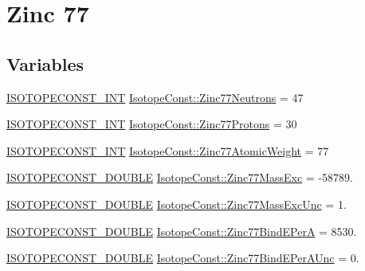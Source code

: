 \hypertarget{group___isotope_const-_zinc-_zn77}{}\section{Zinc 77}
\label{group___isotope_const-_zinc-_zn77}
\subsection*{Variables}
\begin{DoxyCompactItemize}
\item 
\mbox{\hyperlink{group___isotope_const-_macros_ga5f18360b3e99483a35c32d789e62621c}{I\+S\+O\+T\+O\+P\+E\+C\+O\+N\+S\+T\+\_\+\+I\+NT}} \mbox{\hyperlink{group___isotope_const-_zinc-_zn77_gaf83b475d95442bf20d1c2afee7363bde}{Isotope\+Const\+::\+Zinc77\+Neutrons}} = 47
\item 
\mbox{\hyperlink{group___isotope_const-_macros_ga5f18360b3e99483a35c32d789e62621c}{I\+S\+O\+T\+O\+P\+E\+C\+O\+N\+S\+T\+\_\+\+I\+NT}} \mbox{\hyperlink{group___isotope_const-_zinc-_zn77_gad1f29d86127bbfd0b9ba11cf315a9091}{Isotope\+Const\+::\+Zinc77\+Protons}} = 30
\item 
\mbox{\hyperlink{group___isotope_const-_macros_ga5f18360b3e99483a35c32d789e62621c}{I\+S\+O\+T\+O\+P\+E\+C\+O\+N\+S\+T\+\_\+\+I\+NT}} \mbox{\hyperlink{group___isotope_const-_zinc-_zn77_ga0e0edac8ec4bfad965b42fb162c54b7f}{Isotope\+Const\+::\+Zinc77\+Atomic\+Weight}} = 77
\item 
\mbox{\hyperlink{group___isotope_const-_macros_ga8f45a7272ce02c0b4c65c44636ed719a}{I\+S\+O\+T\+O\+P\+E\+C\+O\+N\+S\+T\+\_\+\+D\+O\+U\+B\+LE}} \mbox{\hyperlink{group___isotope_const-_zinc-_zn77_ga7d6e40d8e149b7a7a3e6421b8f39d718}{Isotope\+Const\+::\+Zinc77\+Mass\+Exc}} = -\/58789.
\item 
\mbox{\hyperlink{group___isotope_const-_macros_ga8f45a7272ce02c0b4c65c44636ed719a}{I\+S\+O\+T\+O\+P\+E\+C\+O\+N\+S\+T\+\_\+\+D\+O\+U\+B\+LE}} \mbox{\hyperlink{group___isotope_const-_zinc-_zn77_ga12800d3294bad76a0795364d4e72868f}{Isotope\+Const\+::\+Zinc77\+Mass\+Exc\+Unc}} = 1.
\item 
\mbox{\hyperlink{group___isotope_const-_macros_ga8f45a7272ce02c0b4c65c44636ed719a}{I\+S\+O\+T\+O\+P\+E\+C\+O\+N\+S\+T\+\_\+\+D\+O\+U\+B\+LE}} \mbox{\hyperlink{group___isotope_const-_zinc-_zn77_ga7f7660dde0393b3ac4640e4b68af1902}{Isotope\+Const\+::\+Zinc77\+Bind\+E\+PerA}} = 8530.
\item 
\mbox{\hyperlink{group___isotope_const-_macros_ga8f45a7272ce02c0b4c65c44636ed719a}{I\+S\+O\+T\+O\+P\+E\+C\+O\+N\+S\+T\+\_\+\+D\+O\+U\+B\+LE}} \mbox{\hyperlink{group___isotope_const-_zinc-_zn77_ga279dce67ad22fe3132fe0299af8d3335}{Isotope\+Const\+::\+Zinc77\+Bind\+E\+Per\+A\+Unc}} = 0.

\end{DoxyCompactItemize}
